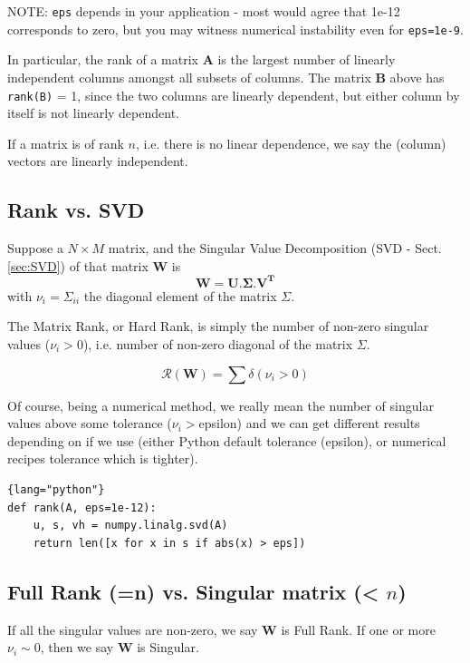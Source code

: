NOTE: \verb!eps! depends in your application - most would agree that 1e-12
corresponds to zero, but you may witness numerical instability even for
\verb!eps=1e-9!.


In particular, the rank of a matrix $\mathbf{A}$ is the largest number of
linearly independent columns amongst all subsets of columns.
The matrix $\mathbf{B}$ above  has \verb!rank(B)! = 1, since the two columns are
linearly dependent, but either column by itself is not linearly dependent.


If a matrix is of rank $n$, i.e. there is no linear dependence, we say the
(column) vectors are linearly independent.

\subsection{Rank vs. SVD}

Suppose a $N\times M$ matrix, and the Singular Value Decomposition (SVD -
Sect.\ref{sec:SVD}) of that matrix $\mathbf{W}$ is
\begin{equation}
\mathbf{W} = \mathbf{U. \Sigma. V^T}
\end{equation}
with $\nu_i = \Sigma_{ii}$ the diagonal element of the matrix $\Sigma$.

The Matrix Rank, or Hard Rank, is simply the number of non-zero singular values
($\nu_i > 0$), i.e. number of non-zero diagonal of the matrix $\Sigma$.

\begin{equation}
\mathcal{R}(\mathbf{W}) = \sum \delta(\nu_i > 0)
\end{equation}

Of course, being a numerical method, we really mean the number of singular
values above some tolerance ($\nu_i > $epsilon) and we can get different results
depending on if we use (either Python default tolerance (epsilon), or numerical recipes
tolerance which is tighter).
\begin{lstlisting}{lang="python"}
def rank(A, eps=1e-12):
    u, s, vh = numpy.linalg.svd(A)
    return len([x for x in s if abs(x) > eps])
\end{lstlisting}



\subsection{Full Rank (=n) vs. Singular matrix (< $n$)}

If all the singular values are non-zero, we say $\mathbf{W}$  is Full Rank. If one
or more $\nu_{i}\sim 0$, then we say $\mathbf{W}$  is Singular.

